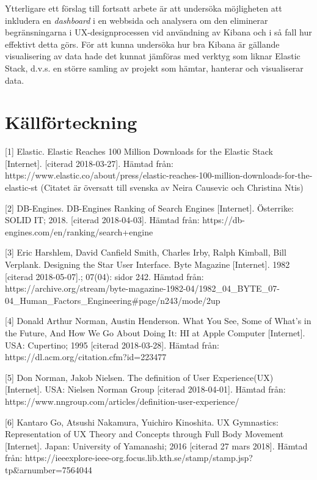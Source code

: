 \documentclass[12pt]{kththesis}
\begin{document}
Ytterligare ett förslag till fortsatt arbete är att undersöka möjligheten att inkludera en \textit{dashboard} i en webbsida och analysera om den eliminerar begränsningarna i UX-designprocessen vid användning av Kibana och i så fall hur effektivt detta görs. För att kunna undersöka hur bra Kibana är gällande visualisering av data hade det kunnat jämföras med verktyg som liknar Elastic Stack, d.v.s. en större samling av projekt som hämtar, hanterar och visualiserar data. 

\afterpage{\null\newpage}

\chapter{Källförteckning}
[1] Elastic. Elastic Reaches 100 Million Downloads for the Elastic Stack [Internet]. [citerad 2018-03-27]. Hämtad från: https://www.elastic.co/about/press\newline/elastic-reaches-100-million-downloads-for-the-elastic-st (Citatet är översatt till svenska av Neira Causevic och Christina Ntis)

[2] DB-Engines. DB-Engines Ranking of Search Engines [Internet]. Österrike: SOLID IT; 2018. [citerad 2018-04-03]. Hämtad från:\newline  
https://db-engines.com/en/ranking/search+engine  

[3] Eric Harshlem, David Canfield Smith, Charles Irby, Ralph Kimball, Bill Verplank. Designing the Star User Interface. Byte Magazine [Internet]. 1982  [citerad 2018-05-07].; 07(04): sidor 242. Hämtad från: \newline https://archive.org/stream/byte-magazine-1982-04/1982\_04\_BYTE\_07-04\newline\_Human\_Factors\_Engineering\#page/n243/mode/2up    
   
[4] Donald Arthur Norman, Austin Henderson. What You See, Some of What's in the Future, And How We Go About Doing It: HI at Apple Computer [Internet]. USA: Cupertino; 1995 [citerad 2018-03-28]. Hämtad från: https://dl.acm.org/citation.cfm?id=223477

[5] Don Norman, Jakob Nielsen. The definition of User Experience(UX) [Internet]. USA: Nielsen Norman Group [citerad 2018-04-01]. Hämtad från:  https://www.nngroup.com/articles/definition-user-experience/        
                           
[6] Kantaro Go, Atsushi Nakamura, Yuichiro Kinoshita. UX Gymnastics: Representation of UX Theory and Concepts through Full Body Movement [Internet].  Japan: University of Yamanashi; 2016 [citerad 27 mars 2018]. Hämtad från: https://ieeexplore-ieee-org.focus.lib.kth.se\newline/stamp/stamp.jsp?tp\=\&arnumber=7564044
                                           
\end{document}

